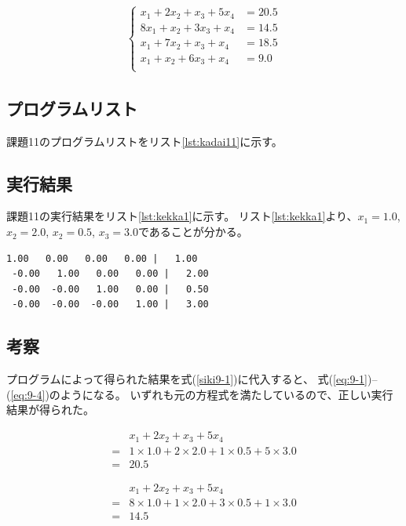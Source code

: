 \documentclass[a4j,titlepage]{jsarticle}
\begin{document}
\begin{align}
  \begin{cases}
      x_1 + 2 x_2 +   x_3 + 5 x_4 &= 20.5 \\
    8 x_1 +   x_2 + 3 x_3 +   x_4 &= 14.5 \\
      x_1 + 7 x_2 +   x_3 +   x_4 &= 18.5 \\
      x_1 +   x_2 + 6 x_3 +   x_4 &= 9.0 \\
  \end{cases}
  \label{siki9-1}
\end{align}

\subsection{プログラムリスト}
課題11のプログラムリストをリスト\ref{lst:kadai11}に示す。



\subsection{実行結果}
課題11の実行結果をリスト\ref{lst:kekka1}に示す。
リスト\ref{lst:kekka1}より、$x_1 = 1.0$, $x_2 = 2.0$, $x_2 = 0.5$, $x_3 = 3.0$であることが分かる。

\begin{lstlisting}[style=text,caption=課題11の実行結果,label=lst:kekka1]
  1.00   0.00   0.00   0.00 |   1.00
 -0.00   1.00   0.00   0.00 |   2.00
 -0.00  -0.00   1.00   0.00 |   0.50
 -0.00  -0.00  -0.00   1.00 |   3.00
\end{lstlisting}

\subsection{考察}
プログラムによって得られた結果を式(\ref{siki9-1})に代入すると、
式(\ref{eq:9-1})--(\ref{eq:9-4})のようになる。
いずれも元の方程式を満たしているので、正しい実行結果が得られた。

\begin{align}
  & x_1 + 2 x_2 + x_3 + 5 x_4 \nonumber \\
  = & 1 \times 1.0 + 2 \times 2.0 + 1 \times 0.5 + 5 \times 3.0
  \label{eq:9-1} \\
  = & 20.5 \nonumber
\end{align}

\begin{align}
  & x_1 + 2 x_2 + x_3 + 5 x_4 \nonumber \\
  = & 8 \times 1.0 + 1 \times 2.0 + 3 \times 0.5 + 1 \times 3.0
  \label{eq:9-2} \\
  = & 14.5 \nonumber
\end{align}
\end{document}
